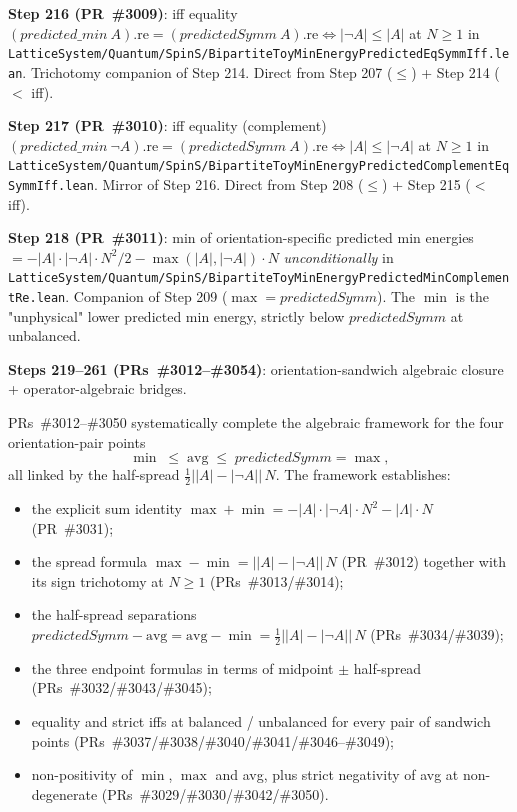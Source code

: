 \documentclass[a4paper,11pt]{article}
\begin{document}
\textbf{Step 216 (PR~\#3009)}: iff equality
$(predicted\_min\ A).\mathrm{re} = (predictedSymm\ A).\mathrm{re}
\Leftrightarrow |\neg A| \le |A|$ at $N \ge 1$ in
\texttt{LatticeSystem/Quantum/SpinS/BipartiteToyMinEnergyPredictedEqSymmIff.lean}.
Trichotomy companion of Step 214. Direct from Step 207 ($\le$) +
Step 214 ($<$ iff).

\textbf{Step 217 (PR~\#3010)}: iff equality (complement)
$(predicted\_min\ \neg A).\mathrm{re} = (predictedSymm\ A).\mathrm{re}
\Leftrightarrow |A| \le |\neg A|$ at $N \ge 1$ in
\texttt{LatticeSystem/Quantum/SpinS/BipartiteToyMinEnergyPredictedComplementEqSymmIff.lean}.
Mirror of Step 216. Direct from Step 208 ($\le$) + Step 215 ($<$ iff).

\textbf{Step 218 (PR~\#3011)}: min of orientation-specific predicted
min energies $= -|A|\cdot|\neg A|\cdot N^2/2 - \max(|A|, |\neg A|)\cdot N$
\emph{unconditionally} in
\texttt{LatticeSystem/Quantum/SpinS/BipartiteToyMinEnergyPredictedMinComplementRe.lean}.
Companion of Step 209 ($\max = predictedSymm$). The $\min$ is the
"unphysical" lower predicted min energy, strictly below $predictedSymm$
at unbalanced.

\textbf{Steps 219--261 (PRs~\#3012--\#3054)}: orientation-sandwich
algebraic closure + operator-algebraic bridges.

PRs~\#3012--\#3050 systematically complete the algebraic framework
for the four orientation-pair points
\begin{equation*}
  \min \;\le\; \mathrm{avg} \;\le\; predictedSymm = \max,
\end{equation*}
all linked by the half-spread $\frac{1}{2}\bigl||A| - |\neg A|\bigr|\,N$.
The framework establishes:
\begin{itemize}
  \item the explicit sum identity $\max + \min = -|A|\cdot|\neg A|\cdot N^2 - |\Lambda|\cdot N$ (PR~\#3031);
  \item the spread formula $\max - \min = \bigl||A| - |\neg A|\bigr|\,N$ (PR~\#3012)
        together with its sign trichotomy at $N \ge 1$ (PRs~\#3013/\#3014);
  \item the half-spread separations $predictedSymm - \mathrm{avg} = \mathrm{avg} - \min
        = \frac{1}{2}\bigl||A| - |\neg A|\bigr|\,N$ (PRs~\#3034/\#3039);
  \item the three endpoint formulas in terms of midpoint $\pm$ half-spread
        (PRs~\#3032/\#3043/\#3045);
  \item equality and strict iffs at balanced / unbalanced for every pair
        of sandwich points (PRs~\#3037/\#3038/\#3040/\#3041/\#3046--\#3049);
  \item non-positivity of $\min$, $\max$ and avg, plus strict negativity
        of avg at non-degenerate (PRs~\#3029/\#3030/\#3042/\#3050).
\end{itemize}
\end{document}
